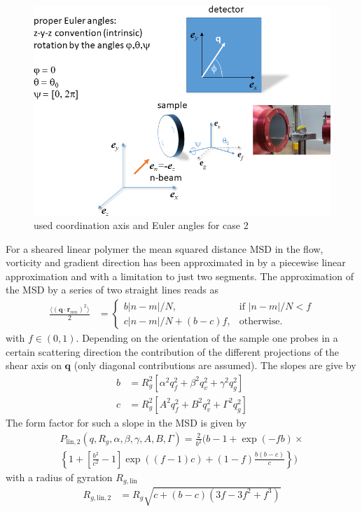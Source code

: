 \begin{figure}[htb]
  \centering
  \includegraphics[width=.9\textwidth]{../images/form_factor/deformed_sheared/Euler_case2.png}
  \caption{used coordination axis and Euler angles for case 2}\label{fig:EulerCase2}
\end{figure}


For a sheared linear polymer the mean squared distance MSD in the flow, vorticity and gradient direction has been approximated in \cite{Korolkovas2019} by a piecewise linear approximation and with a limitation to just two segments.
The approximation of the MSD by a series of two straight lines reads as
\begin{align}\label{eq:2straightlines}
\frac{\langle(\mathbf{q}\cdot\mathbf{r}_{nm})^2\rangle}{2}  &=
\begin{cases}
  b|n-m|/N, & \mbox{if } |n-m|/N<f \\
  c|n-m|/N+(b-c)f, & \mbox{otherwise}.
\end{cases}
\end{align}
with $f\in (0,1)$. Depending on the orientation of the sample one probes in a certain scattering direction the contribution of the different projections of the shear axis on $\mathbf{q}$ (only diagonal contributions are assumed). The slopes are give by
\begin{align}
  b &= R_g^2 \left[\alpha^2q_f^2+\beta^2 q_v^2+\gamma^2 q_g^2\right] \label{eq:slope_b} \\
  c &= R_g^2 \left[A^2q_f^2+B^2 q_v^2+\mathit{\Gamma}^2 q_g^2\right] \label{eq:slope_c}
\end{align}
The form factor for such a slope in the MSD is given by
\begin{multline}\label{eq:slopes_bc_PQ}
P_\mathrm{lin,2}(q,R_g,\alpha,\beta,\gamma,A,B,\mathit{\Gamma}) = \frac{2}{b^2}\Bigg(b-1+\exp\left(-fb\right) \times \\
    \left\{1+\left[\frac{b^2}{c^2}-1\right]\exp\left((f-1)c\right)+(1-f)\frac{b(b-c)}{c}\right\}\Bigg)
\end{multline}
with a radius of gyration $R_{g,\mathrm{lin}}$
\begin{align}\label{eq:Rglin_straight}
  R_{g,\mathrm{lin,2}} &= R_{g}\sqrt{c+(b-c)\left(3f-3f^2+f^3\right)}
\end{align}


